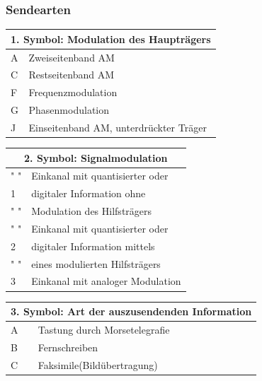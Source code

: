 \begin{frame}
\frametitle{Sendearten}
\begin{tiny}
\begin{minipage}{\textwidth}

\begin{minipage}{0.4\textwidth}
	\begin{tabular}{|l|l|}
	\hline
		\multicolumn{2}{|c|}{\textbf{1. Symbol: Modulation des Haupträgers}}\\
		\hline
		A & Zweiseitenband AM \\ \hline
		C & Restseitenband AM  \\ \hline
		F & Frequenzmodulation  \\ 
		G & Phasenmodulation\\ \hline
		J & Einseitenband AM, unterdrückter Träger\\ \hline		
	\end{tabular}
\end{minipage}
\hspace{1cm}
\begin{minipage}{0.4\textwidth}
	\begin{tabular}{|l|l|}
	\hline
		\multicolumn{2}{|c|}{\textbf{2. Symbol: Signalmodulation}}\\
		\hline
		" " & Einkanal mit quantisierter oder \\
		 1  & digitaler Information ohne \\
		" " & Modulation des Hilfsträgers \\ \hline		
		" " & Einkanal mit quantisierter oder\\
		 2  & digitaler Information mittels \\
		" " & eines modulierten Hilfsträgers \\ \hline	
		 3  & Einkanal mit analoger Modulation  \\ \hline	
	\end{tabular}
\end{minipage}
\end{minipage}
\vspace{0.5cm}
\begin{minipage}{0.4\textwidth}
	\begin{tabular}{|l|l|}
	\hline
		\multicolumn{2}{|c|}{\textbf{3. Symbol: Art der auszusendenden Information}}\\
		\hline
		A & Tastung durch Morsetelegrafie\\ \hline
		B & Fernschreiben \\ \hline
	    C & Faksimile(Bildübertragung)\\ \hline		

\end{tabular}
\end{minipage}
\end{tiny}
\end{frame}
